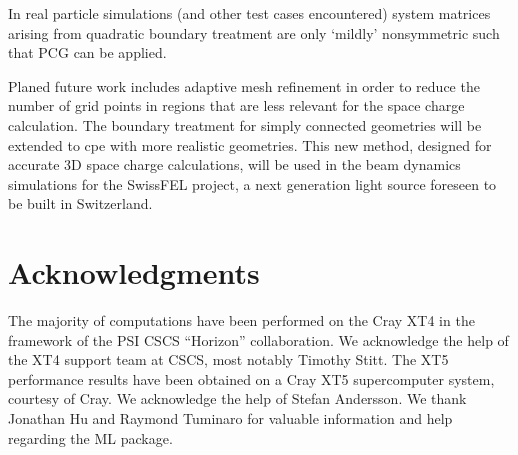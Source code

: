 \documentclass[a4paper,10pt,3p,preprint,pdftex]{elsarticle}
\begin{document}
In real particle simulations (and other test cases encountered) system
matrices arising from quadratic boundary treatment are only `mildly'
nonsymmetric such that PCG can be applied.

Planed future work includes adaptive mesh refinement in order to reduce
the number of grid points in regions that are less relevant for the
space charge calculation.  The boundary treatment for simply connected
geometries will be extended to cpe with more realistic geometries.  This
new method, designed for accurate 3D space charge calculations, will be
used in the beam dynamics simulations for the SwissFEL project, a next
generation light source foreseen to be built in Switzerland.


\section*{Acknowledgments}

The majority of computations have been performed on the Cray XT4 in the
framework of the PSI CSCS ``Horizon'' collaboration.  We acknowledge the
help of the XT4 support team at CSCS, most notably Timothy Stitt.
The XT5 performance results have been obtained on a Cray XT5
supercomputer system, courtesy of Cray.  We acknowledge the help of
Stefan Andersson.
We thank Jonathan Hu and Raymond Tuminaro for valuable information and
help regarding the ML package.



\end{document}
